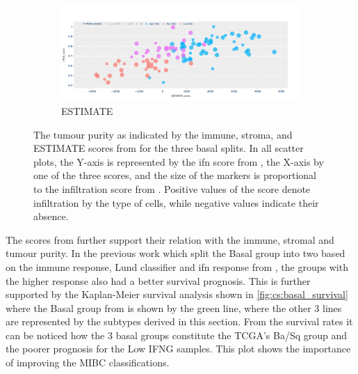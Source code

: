 \begin{figure}[H]
    \centering
    \begin{subfigure}[!t]{1.0\textwidth}
        \includegraphics[width=\textwidth,keepaspectratio]{Sections/ClusteringAnalysis/Resources/discussion/Estimate_spectrum.png}
        \caption{ESTIMATE}
        \label{fig:cs:estimate_basal}
    \end{subfigure}
    \centering
    \caption{The tumour purity as indicated by the immune, stroma, and ESTIMATE scores from \citet{Yoshihara2013-wq} for the three basal splits. In all scatter plots, the Y-axis is represented by the \acrshort{ifn} score from \citet{Baker2022-bj}, the X-axis by one of the three scores, and the size of the markers is proportional to the infiltration score from \citet{Robertson2017-mg}. Positive values of the score denote infiltration by the type of cells, while negative values indicate their absence.}
    \label{fig:cs:tumour_purity}
\end{figure}

The scores from \citet{Yoshihara2013-wq} further support their relation with the immune, stromal and tumour purity. In the previous work which split the Basal group into two based on the immune response, Lund classifier \citet{Marzouka2018-ge} and \acrshort{ifn} response from \citet{Baker2022-bj}, the groups with the higher response also had a better survival prognosis. This is further supported by the Kaplan-Meier survival analysis shown in \cref{fig:cs:basal_survival} where the Basal group from \citet{Robertson2017-mg} is shown by the green line, where the other 3 lines are represented by the subtypes derived in this section. From the survival rates it can be noticed how the 3 basal groups constitute the TCGA's Ba/Sq group and the poorer prognosis for the Low IFNG samples. This plot shows the importance of improving the MIBC classifications. 


